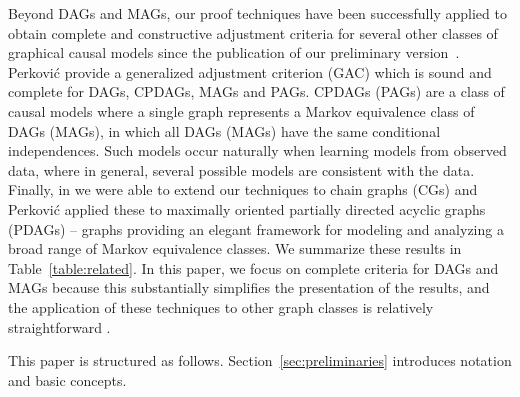 Beyond DAGs and MAGs, our proof techniques have been successfully applied to obtain complete and constructive adjustment criteria for several other classes of graphical causal models since the publication of our preliminary version~\cite{zander2014constructing}.
Perkovi\'{c}\etall \cite{PerkovicEtAl2018} provide a generalized adjustment criterion (GAC) 
which is sound and complete for DAGs, CPDAGs, MAGs and PAGs.
CPDAGs (PAGs) are a class of causal models where a single graph represents a Markov equivalence class of DAGs (MAGs), in which all DAGs (MAGs) have the same conditional independences. %
Such models occur naturally when learning models from observed data, where in general, several possible models are consistent with the data. Finally, in \cite{vanderZander2016separators} we were able to extend our techniques to chain graphs (CGs)
and Perkovi\'{c}\etall \cite{PerkovicEtAl2017} applied these to maximally oriented partially directed acyclic graphs (PDAGs)
--  graphs providing an elegant framework for modeling and analyzing a broad range
of Markov equivalence classes. 
We summarize these results in Table~\ref{table:related}.
In this paper, we focus on complete criteria for DAGs and MAGs because this substantially simplifies the presentation of the results, and the application of these techniques to other graph classes is relatively straightforward \cite[Section~4.3]{PerkovicEtAl2018}.




This paper is structured as follows. %
Section~\ref{sec:preliminaries} introduces notation and basic concepts. 

